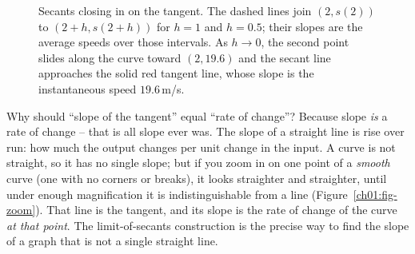 \begin{figure}[htbp]
\centering
{}
\caption{Secants closing in on the tangent. The dashed lines join $(2,s(2))$ to $(2+h,s(2+h))$ for $h=1$ and $h=0.5$; their slopes are the average speeds over those intervals. As $h\to 0$, the second point slides along the curve toward $(2,19.6)$ and the secant line approaches the solid red tangent line, whose slope is the instantaneous speed $19.6$\,m/s.}
\label{ch01:fig-secant-tangent}
\end{figure}

\begin{whybox}
Why should ``slope of the tangent'' equal ``rate of change''? Because slope
\emph{is} a rate of change -- that is all slope ever was. The slope of a straight
line is rise over run: how much the output changes per unit change in the input.
A curve is not straight, so it has no single slope; but if you zoom in on one
point of a \emph{smooth} curve (one with no corners or breaks), it looks
straighter and straighter, until under enough
magnification it is indistinguishable from a line
(Figure~\ref{ch01:fig-zoom}). That line is the tangent, and
its slope is the rate of change of the curve \emph{at that point}. The
limit-of-secants construction is the precise way to find the slope of a
graph that is not a single straight line.
\end{whybox}

